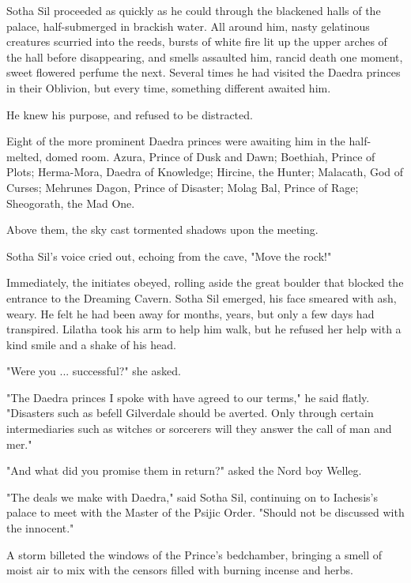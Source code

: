 \clearpage
{}

\dropcap Sotha Sil proceeded as quickly as he could through the blackened halls of the palace, half-submerged in brackish water. All around him, nasty gelatinous creatures scurried into the reeds, bursts of white fire lit up the upper arches of the hall before disappearing, and smells assaulted him, rancid death one moment, sweet flowered perfume the next. Several times he had visited the Daedra princes in their Oblivion, but every time, something different awaited him.

He knew his purpose, and refused to be distracted.

Eight of the more prominent Daedra princes were awaiting him in the half-melted, domed room. Azura, Prince of Dusk and Dawn; Boethiah, Prince of Plots; Herma-Mora, Daedra of Knowledge; Hircine, the Hunter; Malacath, God of Curses; Mehrunes Dagon, Prince of Disaster; Molag Bal, Prince of Rage; Sheogorath, the Mad One.

Above them, the sky cast tormented shadows upon the meeting.

Sotha Sil's voice cried out, echoing from the cave, "Move the rock!"

Immediately, the initiates obeyed, rolling aside the great boulder that blocked the entrance to the Dreaming Cavern. Sotha Sil emerged, his face smeared with ash, weary. He felt he had been away for months, years, but only a few days had transpired. Lilatha took his arm to help him walk, but he refused her help with a kind smile and a shake of his head.

"Were you ... successful?" she asked.

"The Daedra princes I spoke with have agreed to our terms," he said flatly. "Disasters such as befell Gilverdale should be averted. Only through certain intermediaries such as witches or sorcerers will they answer the call of man and mer."

"And what did you promise them in return?" asked the Nord boy Welleg.

"The deals we make with Daedra," said Sotha Sil, continuing on to Iachesis's palace to meet with the Master of the Psijic Order. "Should not be discussed with the innocent."

A storm billeted the windows of the Prince's bedchamber, bringing a smell of moist air to mix with the censors filled with burning incense and herbs.

